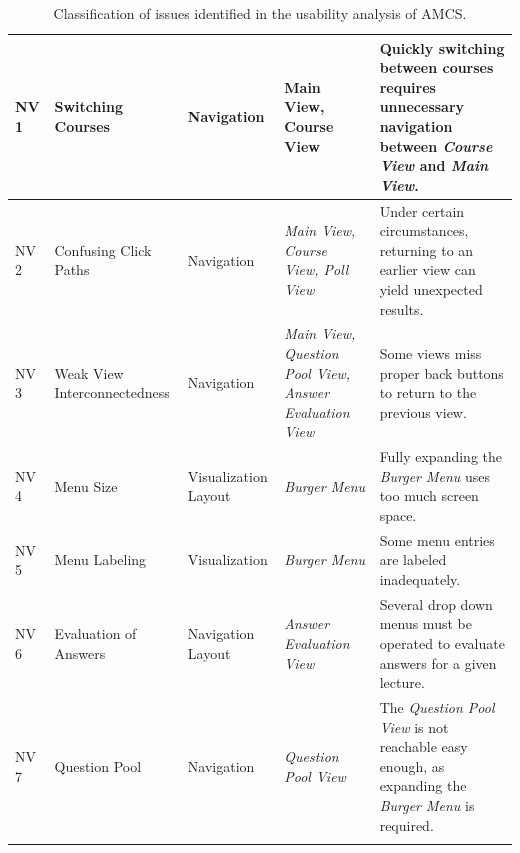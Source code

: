 \begin{longtable}{ | p{0.8cm} | p{2cm} | p{2cm} | p{2.2cm} | p{5.8cm} |}
	NV 1 & Switching Courses & Navigation & Main View, \newline Course View & Quickly switching between courses requires unnecessary navigation between \emph{Course View} and \emph{Main View}. \\ \hline    
	NV 2 & Confusing Click Paths & Navigation & \emph{Main View, \newline Course View, \newline Poll View} & Under certain circumstances, returning to an earlier view can yield unexpected results. \\ \hline
	NV 3 & Weak View Interconnectedness & Navigation & \emph{Main View, \newline Question Pool View, \newline Answer Evaluation View} & Some views miss proper back buttons to return to the previous view. \\ \hline
	NV 4 & Menu Size & Visualization \newline Layout & \emph{Burger Menu} & Fully expanding the \emph{Burger Menu} uses too much screen space. \\ \hline
	NV 5 & Menu Labeling & Visualization & \emph{Burger Menu} & Some menu entries are labeled inadequately. \\ \hline            
	NV 6 & Evaluation of Answers & Navigation \newline Layout & \emph{Answer Evaluation View} & Several drop down menus must be operated to evaluate answers for a given lecture. \\ \hline    
	NV 7 & Question Pool & Navigation & \emph{Question Pool View} & The \emph{Question Pool View} is not reachable easy enough, as expanding the \emph{Burger Menu} is required. \\ \hline                                    
	
	\caption{Classification of issues identified in the usability analysis of AMCS.}
	\label{tab:problems2}
\end{longtable}

